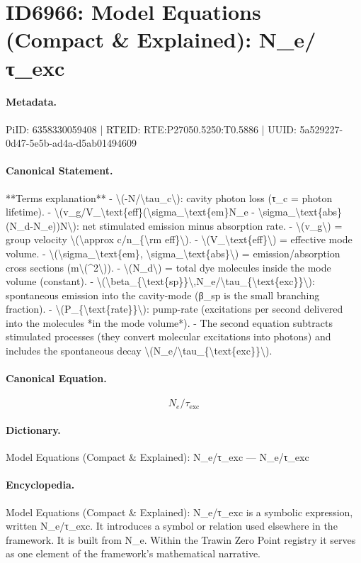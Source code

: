 \section*{ID6966: Model Equations (Compact \& Explained): N\_e/τ\_exc}
\paragraph{Metadata.}
PiID: 6358330059408 | RTEID: RTE:P27050.5250:T0.5886 | UUID: 5a529227-0d47-5e5b-ad4a-d5ab01494609

\paragraph{Canonical Statement.}
**Terms explanation** - \textbackslash{}(-N/\textbackslash{}tau\_c\textbackslash{}): cavity photon loss (τ\_c = photon lifetime). - \textbackslash{}(v\_g/V\_\textbackslash{}text\{eff\}(\textbackslash{}sigma\_\textbackslash{}text\{em\}N\_e - \textbackslash{}sigma\_\textbackslash{}text\{abs\}(N\_d-N\_e))N\textbackslash{}): net stimulated emission minus absorption rate. - \textbackslash{}(v\_g\textbackslash{}) = group velocity \textbackslash{}(\textbackslash{}approx c/n\_\{\textbackslash{}rm eff\}\textbackslash{}). - \textbackslash{}(V\_\textbackslash{}text\{eff\}\textbackslash{}) = effective mode volume. - \textbackslash{}(\textbackslash{}sigma\_\textbackslash{}text\{em\}, \textbackslash{}sigma\_\textbackslash{}text\{abs\}\textbackslash{}) = emission/absorption cross sections (m\textbackslash{}(\textasciicircum{}2\textbackslash{})). - \textbackslash{}(N\_d\textbackslash{}) = total dye molecules inside the mode volume (constant). - \textbackslash{}(\textbackslash{}beta\_\{\textbackslash{}text\{sp\}\}\textbackslash{},N\_e/\textbackslash{}tau\_\{\textbackslash{}text\{exc\}\}\textbackslash{}): spontaneous emission into the cavity-mode (β\_sp is the small branching fraction). - \textbackslash{}(P\_\{\textbackslash{}text\{rate\}\}\textbackslash{}): pump-rate (excitations per second delivered into the molecules *in the mode volume*). - The second equation subtracts stimulated processes (they convert molecular excitations into photons) and includes the spontaneous decay \textbackslash{}(N\_e/\textbackslash{}tau\_\{\textbackslash{}text\{exc\}\}\textbackslash{}).

\paragraph{Canonical Equation.}
\[
N_e/\tau_{\text{exc}}
\]

\paragraph{Dictionary.}
Model Equations (Compact \& Explained): N\_e/τ\_exc — N\_e/τ\_exc

\paragraph{Encyclopedia.}
Model Equations (Compact \& Explained): N\_e/τ\_exc is a symbolic expression, written N\_e/τ\_exc. It introduces a symbol or relation used elsewhere in the framework. It is built from N\_e. Within the Trawin Zero Point registry it serves as one element of the framework's mathematical narrative.
